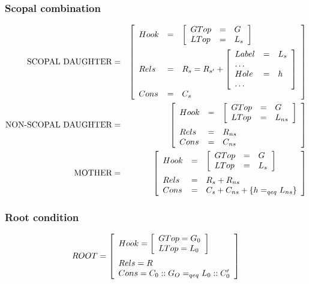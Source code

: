\documentclass[11pt]{article}
\newenvironment{recenv}
{\left[\begin{array}{lll}}
{\end{array}\right]}
\begin{document}
\begin{appendices}
			\subsubsection{Scopal combination}
					\begin{eqnarray*}
					\mbox{SCOPAL DAUGHTER} &=&
					\left[
					\begin{array}{lll}
					Hook &=& \left[\begin{array}{lll}
						GTop &=& G\\
						LTop &=& L_s
					\end{array}\right]\vspace{2mm} \\ 
					Rels &=& R_s = R_{s'}+\left[\begin{array}{lll}
					Label &=& L_s\\
					\dots\\
					Hole &=& h\\
					\dots
					\end{array}\right]\\
					Cons &=& C_s
					\end{array}
					\right]\\
					\mbox{NON-SCOPAL DAUGHTER} &=&
					\left[
					\begin{array}{lll}
					Hook &=& \left[\begin{array}{lll}
					GTop &=& G\\
					LTop &=& L_{ns}
					\end{array}\right]\vspace{2mm} \\
					Rels &=& R_{ns}\\
					Cons &=& C_{ns}
					\end{array}
					\right]\\
					\mbox{MOTHER} &=& 
					\left[
					\begin{array}{lll}
					Hook &=& \left[\begin{array}{lll}
					GTop &=& G\\
					LTop &=& L_s
					\end{array}\right] \vspace{2mm} \\
					Rels &=& R_s+R_{ns}\\
					Cons &=& C_s+C_{ns}+\lbrace h =_{qeq} L_{ns}\rbrace
					\end{array}
					\right]
				\end{eqnarray*}
			\subsubsection{Root condition}
				\begin{equation*}
					ROOT = \begin{recenv}
						Hook = \begin{recenv}
							GTop = G_0 \\
							LTop = L_0
						\end{recenv} \vspace{2mm} \\
						Rels = R \\
						Cons = C_0 :: G_O =_{qeq} L_0 :: C_0'
					\end{recenv}
				\end{equation*}

\end{appendices}
\end{document}
